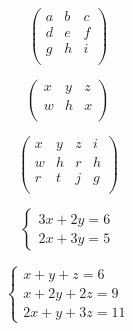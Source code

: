 \documentclass[12pt, a4paper, oneside]{article}
\begin{document}
\vspace{1,0cm}

\begin{equation}
\left(
\begin{array}{lcr}
 a & b & c \\
 d & e & f \\
 g & h & i \\
\end{array}
\right) 
\end{equation}

\vspace{1,0cm}
\begin{equation}
\begin{pmatrix}
 x & y & z\\
 w & h & x\\
\end{pmatrix}
\end{equation}

\vspace{1,0cm}

\begin{equation}
\begin{pmatrix}
 x & y & z & i\\
 w & h & r & h\\
 r & t & j & g\\
\end{pmatrix}
\end{equation}
  
\vspace{1,0cm}

\begin{equation}
\left\lbrace %
\begin{array}{cc}%
      3x+2y =6\\
      2x+3y = 5
\end{array}
\right. %
\end{equation} 

\vspace{1,0cm}

\begin{equation}
\left\lbrace
\begin{array}{ccc}
  x + y + z = 6\\
  x + 2y + 2z =9\\
  2x + y + 3z = 11
\end{array}
\right.
\end{equation}
\end{document}
